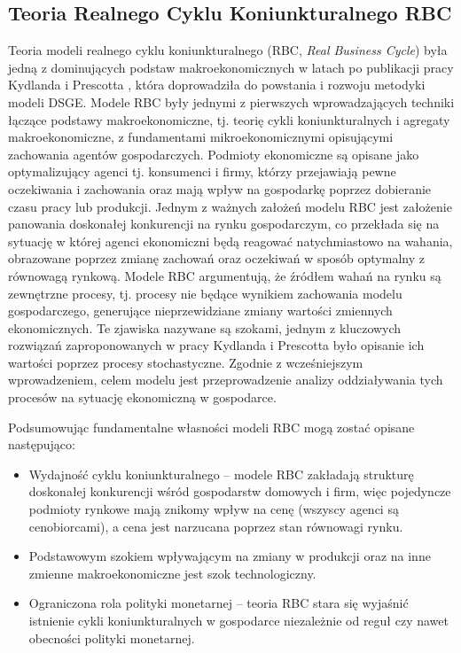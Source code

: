 \subsection{Teoria Realnego Cyklu Koniunkturalnego RBC}

Teoria modeli realnego cyklu koniunkturalnego (RBC, \emph{Real Business Cycle}) była jedną z dominujących podstaw makroekonomicznych w latach po publikacji pracy Kydlanda i Prescotta \cite{prescott_kydland}, która doprowadziła do powstania i rozwoju metodyki modeli DSGE. Modele RBC były jednymi z pierwszych wprowadzających techniki łączące podstawy makroekonomiczne, tj. teorię cykli koniunkturalnych i agregaty makroekonomiczne, z fundamentami mikroekonomicznymi opisującymi zachowania agentów gospodarczych. Podmioty ekonomiczne są opisane jako optymalizujący agenci tj. konsumenci i firmy, którzy przejawiają pewne oczekiwania i zachowania oraz mają wpływ na gospodarkę poprzez dobieranie czasu pracy lub produkcji. Jednym z ważnych założeń modelu RBC jest założenie panowania doskonałej konkurencji na rynku gospodarczym, co przekłada się na sytuację w której agenci ekonomiczni będą reagować natychmiastowo na wahania, obrazowane poprzez zmianę zachowań oraz oczekiwań w sposób optymalny z równowagą rynkową. Modele RBC argumentują, że źródłem wahań na rynku są zewnętrzne procesy, tj. procesy nie będące wynikiem zachowania modelu gospodarczego, generujące nieprzewidziane zmiany wartości zmiennych ekonomicznych. Te zjawiska nazywane są szokami, jednym z kluczowych rozwiązań zaproponowanych w pracy Kydlanda i Prescotta było opisanie ich wartości poprzez procesy stochastyczne. Zgodnie z wcześniejszym wprowadzeniem, celem modelu jest przeprowadzenie analizy oddziaływania tych procesów na sytuację ekonomiczną w gospodarce.

Podsumowując fundamentalne własności modeli RBC\cite{gali} mogą zostać opisane następująco:
\begin{itemize}
    \item Wydajność cyklu koniunkturalnego -- modele RBC zakładają strukturę doskonałej konkurencji wśród gospodarstw domowych i firm, więc pojedyncze podmioty rynkowe mają znikomy wpływ na cenę (wszyscy agenci są cenobiorcami), a cena jest narzucana poprzez stan równowagi rynku.
    \item Podstawowym szokiem wpływającym na zmiany w produkcji oraz na inne zmienne makroekonomiczne jest szok technologiczny.
    \item Ograniczona rola polityki monetarnej -- teoria RBC stara się wyjaśnić istnienie cykli koniunkturalnych w gospodarce niezależnie od reguł czy nawet obecności polityki monetarnej.
\end{itemize}

